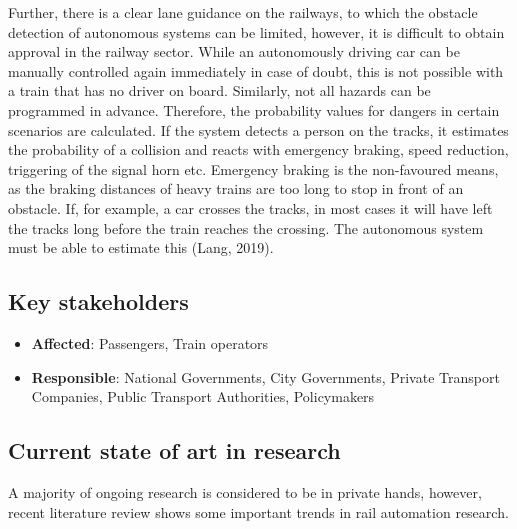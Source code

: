 \documentclass[
]{book}
\providecommand{\tightlist}{%
  \setlength{\itemsep}{0pt}\setlength{\parskip}{0pt}}
\begin{document}
Further, there is a clear lane guidance on the railways, to which the obstacle detection of autonomous systems can be limited, however, it is difficult to obtain approval in the railway sector. While an autonomously driving car can be manually controlled again immediately in case of doubt, this is not possible with a train that has no driver on board. Similarly, not all hazards can be programmed in advance. Therefore, the probability values for dangers in certain scenarios are calculated. If the system detects a person on the tracks, it estimates the probability of a collision and reacts with emergency braking, speed reduction, triggering of the signal horn etc. Emergency braking is the non-favoured means, as the braking distances of heavy trains are too long to stop in front of an obstacle. If, for example, a car crosses the tracks, in most cases it will have left the tracks long before the train reaches the crossing. The autonomous system must be able to estimate this (Lang, 2019).

\hypertarget{key-stakeholders-40}{%
\subsection*{Key stakeholders}\label{key-stakeholders-40}}

\begin{itemize}
\tightlist
\item
  \textbf{Affected}: Passengers, Train operators
\item
  \textbf{Responsible}: National Governments, City Governments, Private Transport Companies, Public Transport Authorities, Policymakers
\end{itemize}

\hypertarget{current-state-of-art-in-research-40}{%
\subsection*{Current state of art in research}\label{current-state-of-art-in-research-40}}

A majority of ongoing research is considered to be in private hands, however, recent literature review shows some important trends in rail automation research.
\end{document}

